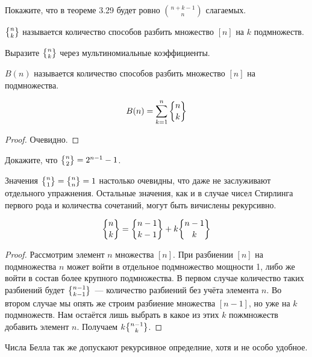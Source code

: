 \begin{exercise}
Покажите, что в теореме 3.29 будет ровно $n + k - 1 \choose n$ слагаемых.
\end{exercise}

\begin{definition}
 $\sstirling{n}{k}$ называется количество способов разбить множество $[n]$ на $k$ подмножеств.
\end{definition}

\begin{exercise}
Выразите $\sstirling{n}{k}$ через мультиномиальные коэффициенты.
\end{exercise}

\begin{definition}
 $B(n)$ называется количество способов разбить множество $[n]$ на подмножества.
\end{definition}

\begin{thm}
$$B(n) = \sum_{k=1}^n\sstirling{n}{k}$$
\end{thm}
\begin{proof}
Очевидно.
\end{proof}

\begin{exercise}
Докажите, что $\sstirling{n}{2} = 2^{n-1} - 1$.
\end{exercise}

Значения $\sstirling{n}{1} = \sstirling{n}{n} = 1$ настолько очевидны, что даже не заслуживают отдельного упражнения. Остальные значения, как и в случае чисел Стирлинга первого рода и количества сочетаний, могут быть вичислены рекурсивно.

\begin{thm}
$$\sstirling{n}{k} = \sstirling{n-1}{k-1} + k\sstirling{n-1}{k}$$
\end{thm}
\begin{proof}
Рассмотрим элемент $n$ множества $[n]$. При разбиении $[n]$ на подмножества $n$ может войти в отдельное подмножество мощности 1, либо же войти в состав более крупного подмножества. В первом случае количество таких разбиений будет $\sstirling{n-1}{k-1}$~--- количество разбиений без учёта элемента $n$. Во втором случае мы опять же строим разбиение множества $[n-1]$, но уже на $k$ подмножеств. Нам остаётся лишь выбрать в какое из этих $k$ пожмножеств добавить элемент $n$. Получаем $k\sstirling{n-1}{k}$.
\end{proof}

Числа Белла так же допускают рекурсивное определние, хотя и не особо удобное.

